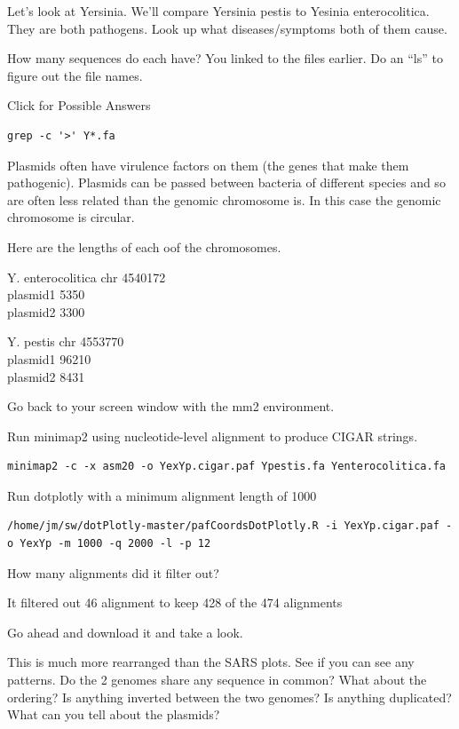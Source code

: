 \documentclass[
]{book}
\begin{document}
Let's look at Yersinia. We'll compare Yersinia pestis to Yesinia enterocolitica. They are both pathogens. Look up what diseases/symptoms both of them cause.

How many sequences do each have? You linked to the files earlier. Do an ``ls'' to figure out the file names.

Click for Possible Answers

\begin{verbatim}
grep -c '>' Y*.fa
\end{verbatim}

\hfill\break

Plasmids often have virulence factors on them (the genes that make them pathogenic). Plasmids can be passed between bacteria of different species and so are often less related than the genomic chromosome is. In this case the genomic chromosome is circular.

Here are the lengths of each oof the chromosomes.

Y. enterocolitica
chr 4540172\\
plasmid1 5350\\
plasmid2 3300

Y. pestis
chr 4553770\\
plasmid1 96210\\
plasmid2 8431

Go back to your screen window with the mm2 environment.

Run minimap2 using nucleotide-level alignment to produce CIGAR strings.

\begin{verbatim}
minimap2 -c -x asm20 -o YexYp.cigar.paf Ypestis.fa Yenterocolitica.fa
\end{verbatim}

Run dotplotly with a minimum alignment length of 1000

\begin{verbatim}
/home/jm/sw/dotPlotly-master/pafCoordsDotPlotly.R -i YexYp.cigar.paf -o YexYp -m 1000 -q 2000 -l -p 12
\end{verbatim}

How many alignments did it filter out?

It filtered out 46 alignment to keep 428 of the 474 alignments

\hfill\break

Go ahead and download it and take a look.

This is much more rearranged than the SARS plots. See if you can see any patterns. Do the 2 genomes share any sequence in common? What about the ordering? Is anything inverted between the two genomes? Is anything duplicated? What can you tell about the plasmids?
\end{document}
